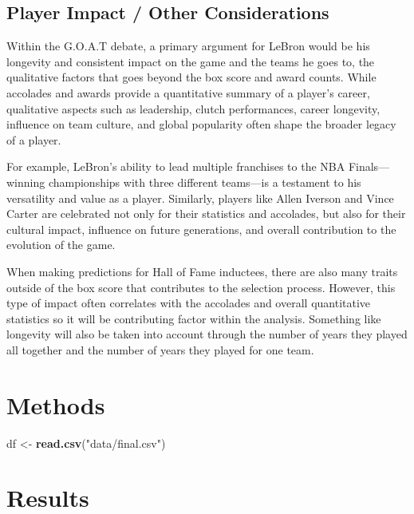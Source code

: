 \documentclass[
  11pt,
]{article}
\newenvironment{Shaded}{\begin{snugshade}}{\end{snugshade}}
\newcommand{\FunctionTok}[1]{\textcolor[rgb]{0.13,0.29,0.53}{\textbf{#1}}}
\newcommand{\NormalTok}[1]{#1}
\newcommand{\OtherTok}[1]{\textcolor[rgb]{0.56,0.35,0.01}{#1}}
\newcommand{\StringTok}[1]{\textcolor[rgb]{0.31,0.60,0.02}{#1}}
\begin{document}
\subsection{Player Impact / Other
Considerations}\label{player-impact-other-considerations}

Within the G.O.A.T debate, a primary argument for LeBron would be his
longevity and consistent impact on the game and the teams he goes to,
the qualitative factors that goes beyond the box score and award counts.
While accolades and awards provide a quantitative summary of a player's
career, qualitative aspects such as leadership, clutch performances,
career longevity, influence on team culture, and global popularity often
shape the broader legacy of a player.

For example, LeBron's ability to lead multiple franchises to the NBA
Finals---winning championships with three different teams---is a
testament to his versatility and value as a player. Similarly, players
like Allen Iverson and Vince Carter are celebrated not only for their
statistics and accolades, but also for their cultural impact, influence
on future generations, and overall contribution to the evolution of the
game.

When making predictions for Hall of Fame inductees, there are also many
traits outside of the box score that contributes to the selection
process. However, this type of impact often correlates with the
accolades and overall quantitative statistics so it will be contributing
factor within the analysis. Something like longevity will also be taken
into account through the number of years they played all together and
the number of years they played for one team.

\section{Methods}\label{methods}

\begin{Shaded}
\begin{Highlighting}[]
\NormalTok{df }\OtherTok{\textless{}{-}} \FunctionTok{read.csv}\NormalTok{(}\StringTok{"data/final.csv"}\NormalTok{)}
\end{Highlighting}
\end{Shaded}

\section{Results}\label{results}
\end{document}

